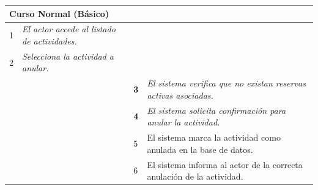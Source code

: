 \begin{table}[H]
    \begin{tabular}{llllllll}
    \hline
    \multicolumn{8}{|l|}{\cellcolor[HTML]{F2F2F2}Curso Normal (Básico)}                                                                                                                                                                                                                                                                          \\ \hline
    \multicolumn{1}{|c|}{1}  & \multicolumn{1}{l|}{{\color[HTML]{808080} \textit{El actor accede al listado de actividades.}}} & \multicolumn{1}{l|}{{\color[HTML]{808080} }}                    & \multicolumn{5}{l|}{{\color[HTML]{808080} }}                                                                                            \\ \hline
    \multicolumn{1}{|c|}{2}   & \multicolumn{1}{p{6cm}|}{{\color[HTML]{808080} \textit{Selecciona la actividad a anular.}}}                                                 & \multicolumn{1}{c|}{} & \multicolumn{5}{p{6cm}|}{{\color[HTML]{808080} \textit{}}}                         \\ \hline
    \multicolumn{1}{|l|}{}   & \multicolumn{1}{l|}{{\color[HTML]{808080} }}                                                          & \multicolumn{1}{l|}{{\color[HTML]{808080} \textbf{3}}}          & \multicolumn{5}{p{6cm}|}{{\color[HTML]{808080} \textit{El sistema verifica que no existan reservas activas asociadas.}}} \\ \hline
    \multicolumn{1}{|c|}{}  & \multicolumn{1}{p{6cm}|}{{\color[HTML]{808080} }} & \multicolumn{1}{l|}{{\color[HTML]{808080} \textbf{4}}}                    & \multicolumn{5}{p{6cm}|}{{\color[HTML]{808080} \textit{El sistema solicita confirmación para anular la actividad.}}}                                                                                            \\ \hline
    \multicolumn{1}{|l|}{}   & \multicolumn{1}{l|}{{\color[HTML]{808080} }}                                                          & \multicolumn{1}{l|}{{\color[HTML]{808080} 5}}                   & \multicolumn{5}{p{6cm}|}{{\color[HTML]{808080} El sistema marca la actividad como anulada en la base de datos.}}                                  \\ \hline
    \multicolumn{1}{|l|}{}   & \multicolumn{1}{l|}{{\color[HTML]{808080} }}                                                          & \multicolumn{1}{l|}{{\color[HTML]{808080} 6}}                   & \multicolumn{5}{p{6cm}|}{{\color[HTML]{808080} El sistema informa al actor de la correcta anulación de la actividad.}}                                  \\ \hline
    \end{tabular}
\end{table}

